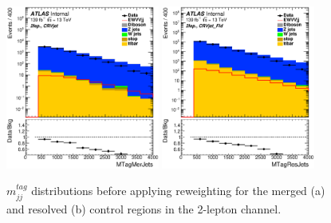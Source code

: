 \begin{figure}[ht]
    \centering
    \includegraphics[width=0.45\textwidth]{figures/2lep/reweighting/before_reweighting/C_0ptag1pfat0pjet_0ptv_CRVjet_MTagMerJets_Log.eps}
    \includegraphics[width=0.45\textwidth]{figures/2lep/reweighting/before_reweighting/C_0ptag2pjet_0ptv_CRVjet_Fid_MTagResJets_Log.eps}
    \caption{ $m^{tag}_{jj}$ distributions before applying reweighting for the merged (a) and resolved (b) control regions in the 2-lepton channel.}
    \label{fig:2lep_mtag_before_rw}
\end{figure}

